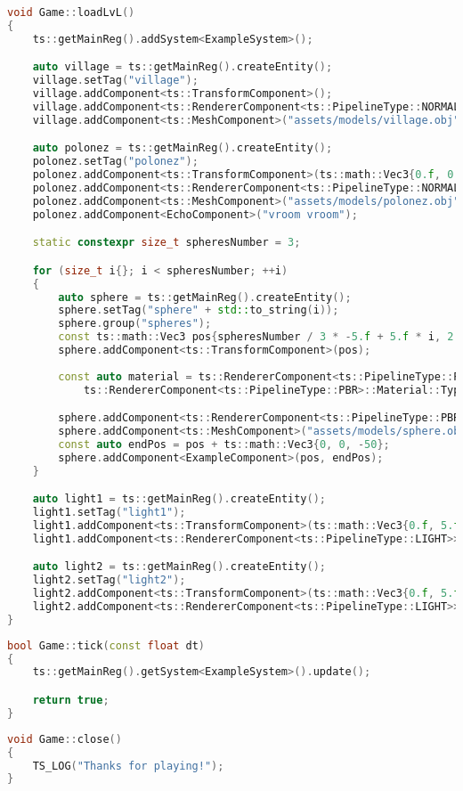 \begin{lstlisting}[language=c++, caption=Example of Game's loadLvL function (./game/game.cpp)]
void Game::loadLvL()
{
    ts::getMainReg().addSystem<ExampleSystem>();

    auto village = ts::getMainReg().createEntity();
    village.setTag("village");
    village.addComponent<ts::TransformComponent>();
    village.addComponent<ts::RendererComponent<ts::PipelineType::NORMAL_LIGHTING>>();
    village.addComponent<ts::MeshComponent>("assets/models/village.obj");

    auto polonez = ts::getMainReg().createEntity();
    polonez.setTag("polonez");
    polonez.addComponent<ts::TransformComponent>(ts::math::Vec3{0.f, 0.f, -10.f});
    polonez.addComponent<ts::RendererComponent<ts::PipelineType::NORMAL_LIGHTING>>();
    polonez.addComponent<ts::MeshComponent>("assets/models/polonez.obj");
    polonez.addComponent<EchoComponent>("vroom vroom");

    static constexpr size_t spheresNumber = 3;

    for (size_t i{}; i < spheresNumber; ++i)
    {
        auto sphere = ts::getMainReg().createEntity();
        sphere.setTag("sphere" + std::to_string(i));
        sphere.group("spheres");
        const ts::math::Vec3 pos{spheresNumber / 3 * -5.f + 5.f * i, 2.f, -5.f};
        sphere.addComponent<ts::TransformComponent>(pos);
     
        const auto material = ts::RendererComponent<ts::PipelineType::PBR>::Material::create(
            ts::RendererComponent<ts::PipelineType::PBR>::Material::Type::GOLD);

        sphere.addComponent<ts::RendererComponent<ts::PipelineType::PBR>>(material);
        sphere.addComponent<ts::MeshComponent>("assets/models/sphere.obj");
        const auto endPos = pos + ts::math::Vec3{0, 0, -50};
        sphere.addComponent<ExampleComponent>(pos, endPos);
    }

    auto light1 = ts::getMainReg().createEntity();
    light1.setTag("light1");
    light1.addComponent<ts::TransformComponent>(ts::math::Vec3{0.f, 5.f, -7.f});
    light1.addComponent<ts::RendererComponent<ts::PipelineType::LIGHT>>();

    auto light2 = ts::getMainReg().createEntity();
    light2.setTag("light2");
    light2.addComponent<ts::TransformComponent>(ts::math::Vec3{0.f, 5.f,  0.f});
    light2.addComponent<ts::RendererComponent<ts::PipelineType::LIGHT>>();
}
\end{lstlisting}

\begin{lstlisting}[language=c++, caption=Example of Game's tick function (./game/game.cpp)]
bool Game::tick(const float dt)
{
    ts::getMainReg().getSystem<ExampleSystem>().update();

    return true;
}
\end{lstlisting}

\begin{lstlisting}[language=c++, caption=Example of Game's close function (./game/game.cpp)]
void Game::close()
{
    TS_LOG("Thanks for playing!");
}
\end{lstlisting}